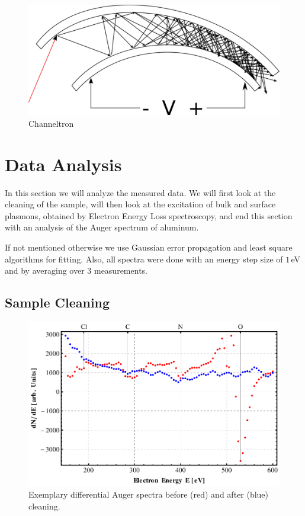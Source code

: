 \documentclass[a4paper,10pt]{scrartcl}
\begin{document}
\begin{figure}
\centering
\includegraphics[scale=0.25]{img/channeltron}
\caption{Channeltron \label{fig:ct}}
\end{figure}

\section{Data Analysis}

In this section we will analyze the measured data. We will first look at the cleaning of the sample, will then look at the excitation of bulk and surface plasmons, obtained by Electron Energy Loss spectroscopy, and end this section with an analysis of the Auger spectrum of aluminum.

If not mentioned otherwise we use Gaussian error propagation and least square algorithms for fitting. Also, all spectra were done with an energy step size of $1\,$eV and by averaging over $3$ measurements.

\subsection{Sample Cleaning}

\begin{figure}
\centering
\includegraphics[scale=0.6]{img/cleaning}
\caption{Exemplary differential Auger spectra before (red) and after (blue) cleaning. \label{fig:cleaning}}
\end{figure}
\end{document}

